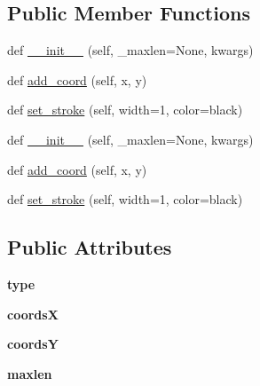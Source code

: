 \subsection*{Public Member Functions}
\begin{DoxyCompactItemize}
\item 
def \hyperlink{classremi_1_1gui_1_1SvgPolyline_a492a0997b812dcfa7d1d38581dc6815c}{\+\_\+\+\_\+init\+\_\+\+\_\+} (self, \+\_\+maxlen=None, kwargs)
\item 
def \hyperlink{classremi_1_1gui_1_1SvgPolyline_a613f2055e7a7f206b2a37ae4408f28a9}{add\+\_\+coord} (self, x, y)
\item 
def \hyperlink{classremi_1_1gui_1_1SvgPolyline_acbe54ac30ce596f54d0e7f272dfd38c3}{set\+\_\+stroke} (self, width=1, color=\textquotesingle{}black\textquotesingle{})
\item 
def \hyperlink{classremi_1_1gui_1_1SvgPolyline_a492a0997b812dcfa7d1d38581dc6815c}{\+\_\+\+\_\+init\+\_\+\+\_\+} (self, \+\_\+maxlen=None, kwargs)
\item 
def \hyperlink{classremi_1_1gui_1_1SvgPolyline_a613f2055e7a7f206b2a37ae4408f28a9}{add\+\_\+coord} (self, x, y)
\item 
def \hyperlink{classremi_1_1gui_1_1SvgPolyline_acbe54ac30ce596f54d0e7f272dfd38c3}{set\+\_\+stroke} (self, width=1, color=\textquotesingle{}black\textquotesingle{})
\end{DoxyCompactItemize}
\subsection*{Public Attributes}
\begin{DoxyCompactItemize}
\item 
{\bfseries type}\hypertarget{classremi_1_1gui_1_1SvgPolyline_ab3c13fbe5ce9798f3b66564cd29c01e7}{}\label{classremi_1_1gui_1_1SvgPolyline_ab3c13fbe5ce9798f3b66564cd29c01e7}

\item 
{\bfseries coordsX}\hypertarget{classremi_1_1gui_1_1SvgPolyline_ae6e264c8e4c6cc3cb7b987589ef449b7}{}\label{classremi_1_1gui_1_1SvgPolyline_ae6e264c8e4c6cc3cb7b987589ef449b7}

\item 
{\bfseries coordsY}\hypertarget{classremi_1_1gui_1_1SvgPolyline_ad40737cd8d05cdbd965a94e1bb9ce844}{}\label{classremi_1_1gui_1_1SvgPolyline_ad40737cd8d05cdbd965a94e1bb9ce844}

\item 
{\bfseries maxlen}\hypertarget{classremi_1_1gui_1_1SvgPolyline_a5ce3069520197472d5188e842706c82f}{}\label{classremi_1_1gui_1_1SvgPolyline_a5ce3069520197472d5188e842706c82f}

\end{DoxyCompactItemize}
